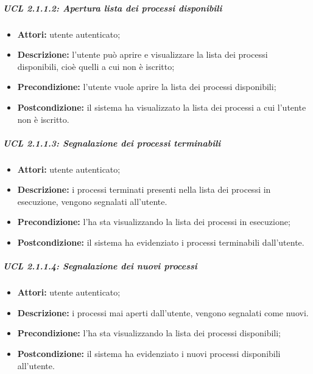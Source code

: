 \subparagraph{UCL 2.1.1.2: Apertura lista dei processi disponibili}
\begin{itemize}
\item \textbf{Attori:} utente autenticato;
\item \textbf{Descrizione:} l'utente può aprire e visualizzare la lista dei processi disponibili, cioè quelli a cui non è iscritto;
\item \textbf{Precondizione:} l'utente vuole aprire la lista dei processi disponibili;
\item \textbf{Postcondizione:} il sistema ha visualizzato la lista dei processi a cui l'utente non è iscritto.
\end{itemize}

\subparagraph{UCL 2.1.1.3: Segnalazione dei processi terminabili}
\begin{itemize}
\item \textbf{Attori:} utente autenticato;
\item \textbf{Descrizione:} i processi terminati presenti nella lista dei processi in esecuzione, vengono segnalati all'utente. 
\item \textbf{Precondizione:} l'ha sta visualizzando la lista dei processi in esecuzione;
\item \textbf{Postcondizione:} il sistema ha evidenziato i processi terminabili dall'utente.
\end{itemize}

\subparagraph{UCL 2.1.1.4: Segnalazione dei nuovi processi}
\begin{itemize}
\item \textbf{Attori:} utente autenticato;
\item \textbf{Descrizione:} i processi mai aperti dall'utente, vengono segnalati come nuovi. 
\item \textbf{Precondizione:} l'ha sta visualizzando la lista dei processi disponibili;
\item \textbf{Postcondizione:} il sistema ha evidenziato i nuovi processi disponibili all'utente.
\end{itemize}

